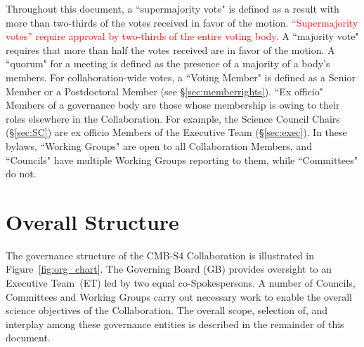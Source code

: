 \documentclass[12pt]{article}
\newcommand{\exec}{{Executive Team}}
\begin{document}
Throughout this document,  a ``supermajority vote" is defined as a result with more than two-thirds of the votes received in favor of  the motion. \textcolor{red}{``Supermajority votes'' require approval by two-thirds of the entire voting body.} A ``majority vote" requires that more than half the votes received are in favor of the motion.   A ``quorum" for a meeting is defined as the presence of a majority of a body's members.   For collaboration-wide votes, a ``Voting Member" is  defined as a Senior Member or a Postdoctoral Member (see \S\ref{sec:memberrights}). ``Ex officio" Members of a governance body are those whose membership is owing to their roles elsewhere in the Collaboration.  For example, the Science Council Chairs (\S\ref{sec:SC}) are ex officio Members of the Executive Team (\S\ref{sec:exec}).  In these bylaws,  ``Working Groups" are open to all Collaboration Members, and ``Councils" have multiple Working Groups reporting to them, while ``Committees" do not.  





\section{Overall Structure}
The governance structure of the CMB-S4 Collaboration  is illustrated in Figure~\ref{fig:org_chart}.  The Governing Board (GB) provides oversight to an \exec\ (ET) led by two equal co-Spokespersons.  A number of Councils, Committees and Working Groups carry out necessary work to enable the overall science objectives of the Collaboration. The overall scope, selection of, and interplay among these governance entities is described in the remainder of this document. 
\end{document}
